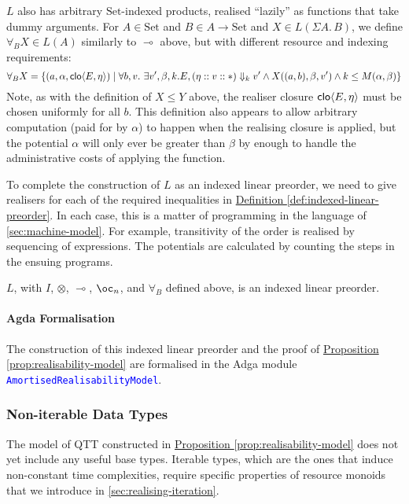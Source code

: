 \documentclass[acmsmall,screen]{acmart}
\newcommand{\Set}{\mathrm{Set}}
\newcommand{\propref}[1]{\hyperref[#1]{Proposition \ref*{#1}}}
\newcommand{\defref}[1]{\hyperref[#1]{Definition \ref*{#1}}}
\newcommand{\AgdaModule}[1]{\textcolor{blue}{\tt #1}}
\begin{document}
$L$ also has arbitrary $\Set$-indexed products, realised ``lazily'' as
functions that take dummy arguments. For $A \in \Set$ and
$B \in A \to \Set$ and $X \in L(\Sigma A.\,B)$, we define
$\forall_B X \in L(A)$ similarly to $\multimap$ above, but with
different resource and indexing requirements:
\begin{displaymath}
  \forall_B X = \{ (a,\alpha,\mathsf{clo}\langle E , \eta \rangle) \mid \forall b, v.~\exists v', \beta, k. E, (\eta :: v :: *) \Downarrow_k v' \land X((a,b),\beta,v') \land k \leq M(\alpha,\beta) \}
\end{displaymath}
Note, as with the definition of $X \leq Y$ above, the realiser closure
$\mathsf{clo}\langle E , \eta \rangle$ must be chosen uniformly for all $b$. This definition
also appears to allow arbitrary computation (paid for by $\alpha$) to
happen when the realising closure is applied, but the potential
$\alpha$ will only ever be greater than $\beta$ by enough to handle
the administrative costs of applying the function.

To complete the construction of $L$ as an indexed linear preorder, we
need to give realisers for each of the required inequalities in
\defref{def:indexed-linear-preorder}. In each case, this is a matter
of programming in the language of \autoref{sec:machine-model}. For
example, transitivity of the order is realised by sequencing of
expressions. The potentials are calculated by counting the steps in
the ensuing programs.

\begin{proposition}\label{prop:realisability-model}
  $L$, with $I$, $\otimes$, $\multimap$, $\oc_n$, and $\forall_{B}$
  defined above, is an indexed linear preorder.
\end{proposition}

\paragraph{Agda Formalisation} The construction of this indexed linear
preorder and the proof of \propref{prop:realisability-model} are
formalised in the Adga module
\AgdaModule{AmortisedRealisabilityModel}.

\subsubsection{Non-iterable Data Types}
\label{sec:noniter-model}

The model of QTT constructed in \propref{prop:realisability-model}
does not yet include any useful base types. Iterable types, which are
the ones that induce non-constant time complexities, require specific
properties of resource monoids that we introduce in
\autoref{sec:realising-iteration}.
\end{document}
